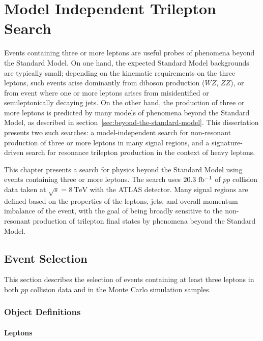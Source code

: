 \chapter{Model Independent Trilepton Search}\label{ch:model-independent-trilepton-search}

Events containing three or more leptons are useful probes of phenomena beyond the Standard Model. On one hand, the expected Standard Model backgrounds are typically small; depending on the kinematic requirements on the three leptons, such events arise dominantly from diboson production ($WZ$, $ZZ$), or from event where one or more leptons arises from misidentified or semileptonically decaying jets. On the other hand, the production of three or more leptons is predicted by many models of phenomena beyond the Standard Model, as described in section~\ref{sec:beyond-the-standard-model}. This dissertation presents two such searches: a model-independent search for non-resonant production of three or more leptons in many signal regions, and a signature-driven search for resonance trilepton production in the context of heavy leptons. 

This chapter presents a search for physics beyond the Standard Model using events containing three or more leptons. The search uses $20.3~\mbox{fb$^{-1}$}$ of $pp$ collision data taken at $\sqrt{s}=8~\mbox{TeV}$ with the ATLAS detector. Many signal regions are defined based on the properties of the leptons, jets, and overall momentum imbalance of the event, with the goal of being broadly sensitive to the non-resonant production of trilepton final states by phenomena beyond the Standard Model. 

\section{Event Selection}\label{sec:model-independent-event-selection}

This section describes the selection of events containing at least three leptons in both $pp$ collision data and in the Monte Carlo simulation samples. 


\subsection{Object Definitions}\label{sec:model-independent-object-definitions}

\subsubsection{Leptons}\label{sec:model-independent-lepton-definitions}

